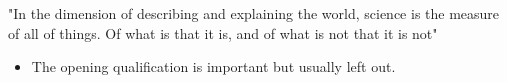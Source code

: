 "In the dimension of describing and explaining the world, science is the measure
of all of things. Of what is that it is, and of what is not that it is not"

\cite{sellars1956empiricism}

\begin{itemize}
    \item The opening qualification is important but usually left out.
\end{itemize}
